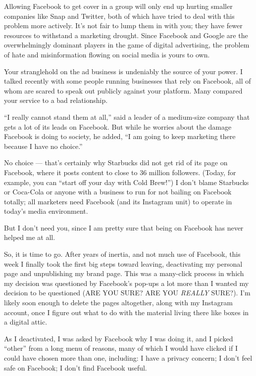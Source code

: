 Allowing Facebook to get cover in a group will only end up hurting
smaller companies like Snap and Twitter, both of which have tried to
deal with this problem more actively. It's not fair to lump them in with
you; they have fewer resources to withstand a marketing drought. Since
Facebook and Google are the overwhelmingly dominant players in the game
of digital advertising, the problem of hate and misinformation flowing
on social media is yours to own.

Your stranglehold on the ad business is undeniably the source of your
power. I talked recently with some people running businesses that rely
on Facebook, all of whom are scared to speak out publicly against your
platform. Many compared your service to a bad relationship.

``I really cannot stand them at all,'' said a leader of a medium-size
company that gets a lot of its leads on Facebook. But while he worries
about the damage Facebook is doing to society, he added, ``I am going to
keep marketing there because I have no choice.''

No choice --- that's certainly why Starbucks did not get rid of its page
on Facebook, where it posts content to close to 36 million followers.
(Today, for example, you can ``start off your day with Cold Brew!'') I
don't blame Starbucks or Coca-Cola or anyone with a business to run for
not bailing on Facebook totally; all marketers need Facebook (and its
Instagram unit) to operate in today's media environment.

But I don't need you, since I am pretty sure that being on Facebook has
never helped me at all.

So, it is time to go. After years of inertia, and not much use of
Facebook, this week I finally took the first big steps toward leaving,
deactivating my personal page and unpublishing my brand page. This was a
many-click process in which my decision was questioned by Facebook's
pop-ups a lot more than I wanted my decision to be questioned (ARE YOU
SURE? ARE YOU \emph{REALLY} SURE?). I'm likely soon enough to delete the
pages altogether, along with my Instagram account, once I figure out
what to do with the material living there like boxes in a digital attic.

As I deactivated, I was asked by Facebook why I was doing it, and I
picked ``other'' from a long menu of reasons, many of which I would have
clicked if I could have chosen more than one, including: I have a
privacy concern; I don't feel safe on Facebook; I don't find Facebook
useful.


